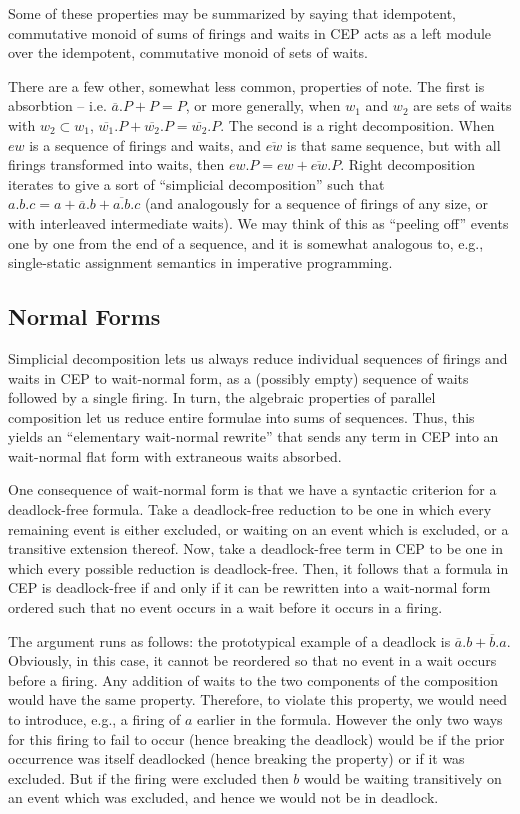 \documentclass[hoptionsi,review,screen,format=sigconf]{acmart}
\theoremstyle{definition}
\begin{document}
Some of these properties may be summarized by saying that idempotent, commutative monoid of sums of firings and waits in CEP acts as a left module over the idempotent, commutative monoid of sets of waits.

There are a few other, somewhat less common, properties of note. The first is absorbtion -- i.e. \(\overline{a}.P + P = P\), or more generally, when \(w_1\) and \(w_2\) are sets of waits with \(w_2 \subset w_1\), \(\overline{w_1}.P + \overline{w_2}.P = \overline{w_2}.P\). The second is a right decomposition. When \(ew\) is a sequence of firings and waits, and \(\overline{ew}\) is that same sequence, but with all firings transformed into waits, then \(ew.P = ew + \overline{ew}.P\). Right decomposition iterates to give a sort of ``simplicial decomposition'' such that \(a.b.c = a + \overline{a}.b + \overline{a.b}.c\) (and analogously for a sequence of firings of any size, or with interleaved intermediate waits). We may think of this as ``peeling off'' events one by one from the end of a sequence, and it is somewhat analogous to, e.g., single-static assignment semantics in imperative programming. 

\subsection{Normal Forms}

Simplicial decomposition lets us always reduce individual sequences of firings and waits in CEP to wait-normal form, as a (possibly empty) sequence of waits followed by a single firing. In turn, the algebraic properties of parallel composition let us reduce entire formulae into sums of sequences. Thus, this yields an ``elementary wait-normal rewrite'' that sends any term in CEP into an wait-normal flat form with extraneous waits absorbed.

One consequence of wait-normal form is that we have a syntactic criterion for a deadlock-free formula. Take a deadlock-free reduction to be one in which every remaining event is either excluded, or waiting on an event which is excluded, or a transitive extension thereof. Now, take a deadlock-free term in CEP to be one in which every possible reduction is deadlock-free. Then, it follows that a formula in CEP is deadlock-free if and only if it can be rewritten into a wait-normal form ordered such that no event occurs in a wait before it occurs in a firing.

The argument runs as follows: the prototypical example of a deadlock is \(\overline{a}.b + \overline{b}.a\). Obviously, in this case, it cannot be reordered so that no event in a wait occurs before a firing. Any addition of waits to the two components of the composition would have the same property. Therefore, to violate this property, we would need to introduce, e.g., a firing of \(a\) earlier in the formula.  However the only two ways for this firing to fail to occur (hence breaking the deadlock) would be if the prior occurrence  was itself deadlocked (hence breaking the property) or if it was excluded. But if the firing were excluded then \(b\) would be waiting transitively on an event which was excluded, and hence we would not be in deadlock.
\end{document}
